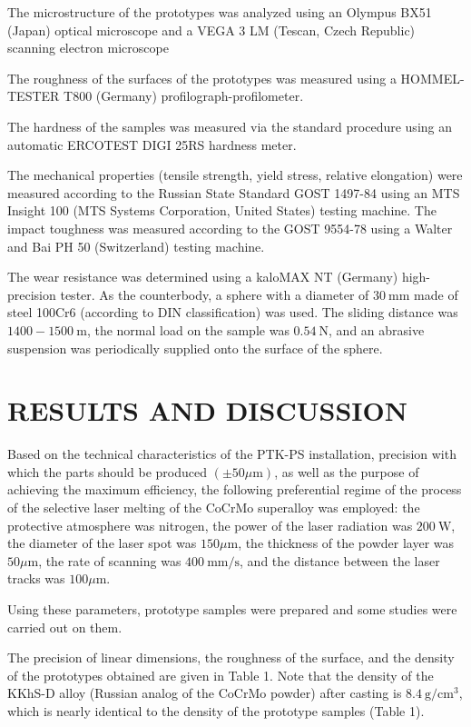 \documentclass[10pt]{article}
\begin{document}
The microstructure of the prototypes was analyzed using an Olympus BX51 (Japan) optical microscope and a VEGA 3 LM (Tescan, Czech Republic) scanning electron microscope

The roughness of the surfaces of the prototypes was measured using a HOMMEL-TESTER T800 (Germany) profilograph-profilometer.

The hardness of the samples was measured via the standard procedure using an automatic ERCOTEST DIGI 25RS hardness meter.

The mechanical properties (tensile strength, yield stress, relative elongation) were measured according to the Russian State Standard GOST 1497-84 using an MTS Insight 100 (MTS Systems Corporation, United States) testing machine. The impact toughness was measured according to the GOST 9554-78 using a Walter and Bai PH 50 (Switzerland) testing machine.

The wear resistance was determined using a kaloMAX NT (Germany) high-precision tester. As the counterbody, a sphere with a diameter of $30 \mathrm{~mm}$ made of steel 100Cr6 (according to DIN classification) was used. The sliding distance was $1400-1500 \mathrm{~m}$, the normal load on the sample was $0.54 \mathrm{~N}$, and an abrasive suspension was periodically supplied onto the surface of the sphere.

\section*{RESULTS AND DISCUSSION}
Based on the technical characteristics of the PTK-PS installation, precision with which the parts should be produced $( \pm 50 \mu \mathrm{m})$, as well as the purpose of achieving the maximum efficiency, the following preferential regime of the process of the selective laser melting of the CoCrMo superalloy was employed: the protective atmosphere was nitrogen, the power of the laser radiation was $200 \mathrm{~W}$, the diameter of the laser spot was $150 \mu \mathrm{m}$, the thickness of the powder layer was $50 \mu \mathrm{m}$, the rate of scanning was $400 \mathrm{~mm} / \mathrm{s}$, and the distance between the laser tracks was $100 \mu \mathrm{m}$.

Using these parameters, prototype samples were prepared and some studies were carried out on them.

The precision of linear dimensions, the roughness of the surface, and the density of the prototypes obtained are given in Table 1. Note that the density of the KKhS-D alloy (Russian analog of the CoCrMo powder) after casting is $8.4 \mathrm{~g} / \mathrm{cm}^{3}$, which is nearly identical to the density of the prototype samples (Table 1).
\end{document}
